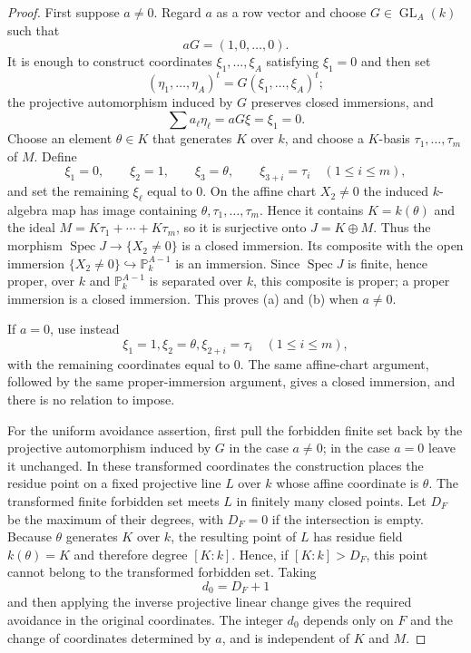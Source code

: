\documentclass{lms}
\DeclareMathOperator{\Spec}{Spec}
\newcommand{\PP}{\mathbb P}
\begin{document}
\begin{proof}
First suppose $a\ne0$.  Regard $a$ as a row vector and choose $G\in\operatorname{GL}_A(k)$ such that
\[
        aG=(1,0,\ldots,0).
\]
It is enough to construct coordinates $\xi_1,\ldots,\xi_A$ satisfying $\xi_1=0$ and then set
\[
        (\eta_1,\ldots,\eta_A)^t=G(\xi_1,\ldots,\xi_A)^t;
\]
the projective automorphism induced by $G$ preserves closed immersions, and
\[
        \sum a_\ell\eta_\ell=aG\xi=\xi_1=0.
\]
Choose an element $\theta\in K$ that generates $K$ over $k$, and choose a $K$-basis $\tau_1,\ldots,\tau_m$ of $M$.  Define
\[
        \xi_1=0,
        \qquad
        \xi_2=1,
        \qquad
        \xi_3=\theta,
        \qquad
        \xi_{3+i}=\tau_i\quad(1\le i\le m),
\]
and set the remaining $\xi_\ell$ equal to $0$.  On the affine chart $X_2\ne0$ the induced $k$-algebra map has image containing $\theta,\tau_1,\ldots,\tau_m$.  Hence it contains $K=k(\theta)$ and the ideal $M=K\tau_1+\cdots+K\tau_m$, so it is surjective onto $J=K\oplus M$.  Thus the morphism $\Spec J\to\{X_2\ne0\}$ is a closed immersion.  Its composite with the open immersion $\{X_2\ne0\}\hookrightarrow\PP^{A-1}_k$ is an immersion.  Since $\Spec J$ is finite, hence proper, over $k$ and $\PP^{A-1}_k$ is separated over $k$, this composite is proper; a proper immersion is a closed immersion.  This proves (a) and (b) when $a\ne0$.

If $a=0$, use instead
\[
        \xi_1=1,
        \xi_2=\theta,
        \xi_{2+i}=\tau_i\quad(1\le i\le m),
\]
with the remaining coordinates equal to $0$.  The same affine-chart argument, followed by the same proper-immersion argument, gives a closed immersion, and there is no relation to impose.

For the uniform avoidance assertion, first pull the forbidden finite set back by the projective automorphism induced by $G$ in the case $a\ne0$; in the case $a=0$ leave it unchanged.  In these transformed coordinates the construction places the residue point on a fixed projective line $L$ over $k$ whose affine coordinate is $\theta$.  The transformed finite forbidden set meets $L$ in finitely many closed points.  Let $D_F$ be the maximum of their degrees, with $D_F=0$ if the intersection is empty.  Because $\theta$ generates $K$ over $k$, the resulting point of $L$ has residue field $k(\theta)=K$ and therefore degree $[K:k]$.  Hence, if $[K:k]>D_F$, this point cannot belong to the transformed forbidden set.  Taking
\[
        d_0=D_F+1
\]
and then applying the inverse projective linear change gives the required avoidance in the original coordinates.  The integer $d_0$ depends only on $F$ and the change of coordinates determined by $a$, and is independent of $K$ and $M$.
\end{proof}
\end{document}
